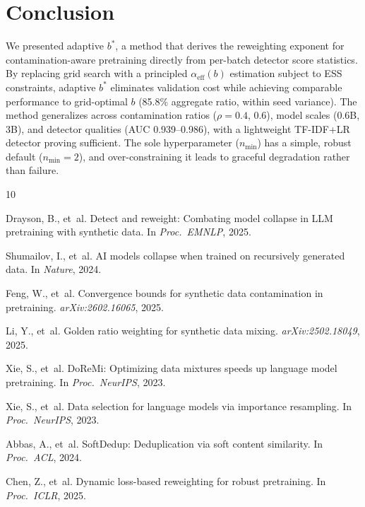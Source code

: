 \documentclass[11pt,a4paper]{article}
\newcommand{\bstar}{b^{*}}
\newcommand{\aeff}{\alpha_{\mathrm{eff}}}
\newcommand{\nmin}{n_{\min}}
\begin{document}
\section{Conclusion}
\label{sec:conclusion}

We presented adaptive $\bstar$, a method that derives the reweighting exponent for contamination-aware pretraining directly from per-batch detector score statistics.
By replacing grid search with a principled $\aeff(b)$ estimation subject to ESS constraints, adaptive $\bstar$ eliminates validation cost while achieving comparable performance to grid-optimal $b$ (85.8\% aggregate ratio, within seed variance).
The method generalizes across contamination ratios ($\rho = 0.4$, $0.6$), model scales (0.6B, 3B), and detector qualities (AUC 0.939--0.986), with a lightweight TF-IDF+LR detector proving sufficient.
The sole hyperparameter ($\nmin$) has a simple, robust default ($\nmin{=}2$), and over-constraining it leads to graceful degradation rather than failure.

\begin{thebibliography}{10}

Drayson, B., et~al.
\newblock Detect and reweight: Combating model collapse in LLM pretraining with synthetic data.
\newblock In \emph{Proc.\ EMNLP}, 2025.

Shumailov, I., et~al.
\newblock AI models collapse when trained on recursively generated data.
\newblock In \emph{Nature}, 2024.

Feng, W., et~al.
\newblock Convergence bounds for synthetic data contamination in pretraining.
\newblock \emph{arXiv:2602.16065}, 2025.

Li, Y., et~al.
\newblock Golden ratio weighting for synthetic data mixing.
\newblock \emph{arXiv:2502.18049}, 2025.

Xie, S., et~al.
\newblock DoReMi: Optimizing data mixtures speeds up language model pretraining.
\newblock In \emph{Proc.\ NeurIPS}, 2023.

Xie, S., et~al.
\newblock Data selection for language models via importance resampling.
\newblock In \emph{Proc.\ NeurIPS}, 2023.

Abbas, A., et~al.
\newblock SoftDedup: Deduplication via soft content similarity.
\newblock In \emph{Proc.\ ACL}, 2024.

Chen, Z., et~al.
\newblock Dynamic loss-based reweighting for robust pretraining.
\newblock In \emph{Proc.\ ICLR}, 2025.

\end{thebibliography}
\end{document}
